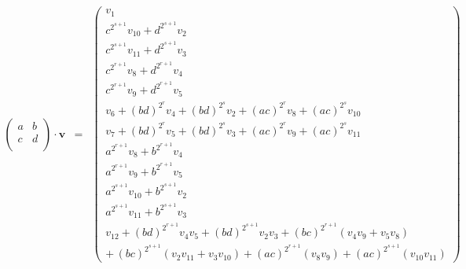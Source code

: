 \begin{eqnarray*}
\left( \begin{matrix}
	      a & b \\
	      c & d \\
	   \end{matrix}\right) \cdot \mathbf{v} &=&
	   \left( \begin{matrix}
	   v_1 \\
	   c^{2^{s+1}} v_{10} + d^{2^{s+1}}v_2 \\
	   c^{2^{s+1}} v_{11} + d^{2^{s+1}}v_3 \\
	   c^{2^{r+1}} v_{8} + d^{2^{r+1}}v_4 \\
	   c^{2^{r+1}} v_{9} + d^{2^{r+1}}v_5 \\
	   v_6 + (bd)^{2^r}v_4 + (bd)^{2^s}v_2 + (ac)^{2^r}v_8 + (ac)^{2^s}v_{10} \\
	   v_7 + (bd)^{2^r}v_5 + (bd)^{2^s}v_3 + (ac)^{2^r}v_9 + (ac)^{2^s}v_{11} \\
	   a^{2^{r+1}}v_8 + b^{2^{r+1}}v_4 \\
	   a^{2^{r+1}}v_9 + b^{2^{r+1}}v_5 \\
	   a^{2^{s+1}}v_{10} + b^{2^{s+1}}v_2 \\
	   a^{2^{s+1}}v_{11} + b^{2^{s+1}}v_3 \\
	   v_{12} + (bd)^{2^{r+1}}v_4v_5 + (bd)^{2^{s+1}}v_2v_3 + (bc)^{2^{r+1}}(v_4v_9 + v_5v_8)\\ +\, (bc)^{2^{s+1}}(v_2v_{11} + v_3v_{10}) + (ac)^{2^{r+1}}(v_8v_9) + (ac)^{2^{s+1}}(v_{10}v_{11})
	   \end{matrix} \right)
\end{eqnarray*}

